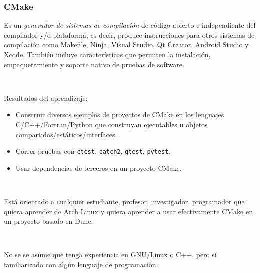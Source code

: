 




\begin{frame}[fragile]
	\frametitle{CMake}
	Es un \emph{generador de sistemas de compilación} de código
	abierto e independiente del compilador y/o plataforma, es decir,
	produce instrucciones para otros sistemas de compilación como
	Makefile, Ninja, Visual Studio, Qt Creator, Android Studio y
	Xcode.
	También incluye características que permiten la instalación,
	empaquetamiento y soporte nativo de pruebas de software.

	\
	
	Resultados del aprendizaje:

	\begin{itemize}
		\item

		Construir diversos ejemplos de proyectos de CMake en los
		lenguajes C/C++/Fortran/Python que construyan ejecutables u
		objetos compartidos/estáticos/interfaces.

		\item

		Correr pruebas con \lstinline{ctest}, \lstinline{catch2},
		\lstinline{gtest}, \lstinline{pytest}.

		\item

		Usar dependencias de terceros en un proyecto CMake.
	\end{itemize}

	\

	Está orientado a cualquier estudiante, profesor, investigador,
	programador que quiera aprender de Arch Linux y quiera aprender
	a usar efectivamente CMake en un proyecto basado en Dune.

	\

	No se se asume que tenga experiencia en GNU/Linux o C++, pero
	sí familiarizado con algún lenguaje de programación.

\end{frame}

